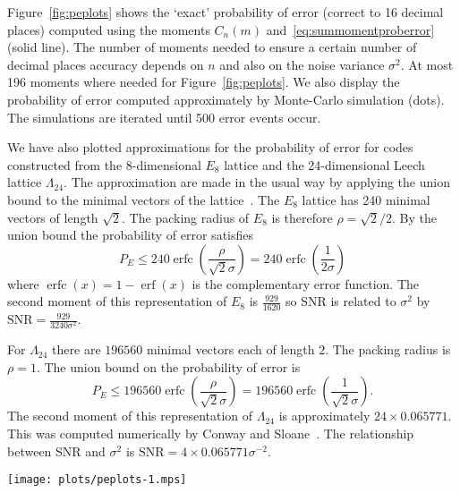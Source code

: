 \documentclass[draftcls, onecolumn, 11pt]{IEEEtran}
\begin{document}
Figure~\ref{fig:peplots} shows the `exact' probability of error (correct to 16 decimal places) computed using the moments $C_n(m)$ and~\eqref{eq:summomentproberror} (solid line).  The number of moments needed to ensure a certain number of decimal places accuracy depends on $n$ and also on the noise variance $\sigma^2$.  At most 196 moments where needed for Figure~\ref{fig:peplots}.  We also display the probability of error computed approximately by Monte-Carlo simulation (dots).  %
The simulations are iterated until 500 error events occur.

We have also plotted approximations for the probability of error for codes constructed from the 8-dimensional $E_8$ lattice and the 24-dimensional Leech lattice $\Lambda_{24}$.  The approximation are made in the usual way by applying the union bound to the minimal vectors of the lattice~\cite[p.~71]{SPLAG}.  The $E_8$ lattice has 240 minimal vectors of length $\sqrt{2}$.  The packing radius of $E_8$ is therefore $\rho = \sqrt{2}/2$.  By the union bound the probability of error satisfies
\newcommand{\erfc}{\operatorname{erfc}}
\newcommand{\erf}{\operatorname{erf}}
\[
P_E \leq 240\erfc\left( \frac{\rho}{\sqrt{2}\sigma} \right) = 240\erfc\left(\frac{1}{2\sigma}\right)
\]
where $\erfc(x) = 1 - \erf(x)$ is the complementary error function.  The second moment of this representation of $E_8$ is $\frac{929}{1620}$ so SNR is related to $\sigma^2$ by $\text{SNR} = \frac{929}{3240\sigma^2}$.

For $\Lambda_{24}$ there are $196560$ minimal vectors each of length $2$.  The packing radius is $\rho = 1$.  The union bound on the probability of error is
\[
P_E \leq 196560\erfc\left( \frac{\rho}{\sqrt{2}\sigma} \right) = 196560\erfc\left(\frac{1}{\sqrt{2}\sigma}\right).
\]
The second moment of this representation of $\Lambda_{24}$ is approximately $24 \times 0.065771$.  This was computed numerically by Conway and Sloane~\cite[p. 61]{SPLAG}.  The relationship between SNR and $\sigma^2$ is $\text{SNR} = 4 \times 0.065771 \sigma^{-2}$.

\begin{figure*}[tp]
	\centering
		\texttt{[image: plots/peplots-1.mps]}
		\caption{The probability of error versus SNR for $A_1 \simeq \ints$, $A_2$, $A_3\simeq D_3$, $A_4$, and $A_5$ and $E_8$ and the Leech lattice $\Lambda_{24}$.}
		\label{fig:peplots}
\end{figure*}
\end{document}
